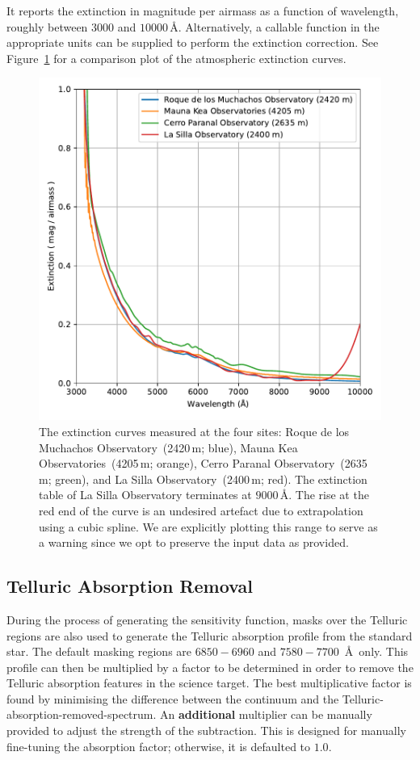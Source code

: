 \documentclass[twocolumn, linenumbers]{aastex631}
\begin{document}
It reports the extinction in magnitude per airmass as a
function of wavelength, roughly between $3000$ and $10000$\,\AA.
Alternatively, a callable function in the appropriate units can be
supplied to perform the extinction correction. See Figure~\ref{fig:extinction}
for a comparison plot of the atmospheric extinction curves.

\begin{figure}
    \centering
    \includegraphics[width=\columnwidth]{fig_07_extinction_curves.pdf}
    \caption{The extinction curves measured at the four sites: Roque de los Muchachos
    Observatory~(2420\,m; blue), Mauna Kea Observatories~(4205\,m; orange),
    Cerro Paranal Observatory~(2635\,m; green), and La Silla Observatory~(2400\,m; red).
    The extinction table of La Silla Observatory terminates at $9000$\,\AA. The rise at
    the red end of the curve is an undesired artefact due to extrapolation using a
    cubic spline. We are explicitly plotting this range to serve as a warning since we
    opt to preserve the input data as provided.}
    \label{fig:extinction}
\end{figure}

\subsection{Telluric Absorption Removal}
During the process of generating the sensitivity function, masks over
the Telluric regions are also used to generate the Telluric absorption
profile from the standard star. The default masking regions are $6850-6960$
and $7580-7700$\ \AA\ only. This profile can then be multiplied
by a factor to be determined in order to remove the Telluric absorption
features in the science target. The best multiplicative factor is found
by minimising the difference between the continuum and the
Telluric-absorption-removed-spectrum. An \textbf{additional} multiplier can
be manually provided to adjust the strength of the subtraction. This is
designed for manually fine-tuning the absorption factor; otherwise, it is
defaulted to $1.0$.
\end{document}
